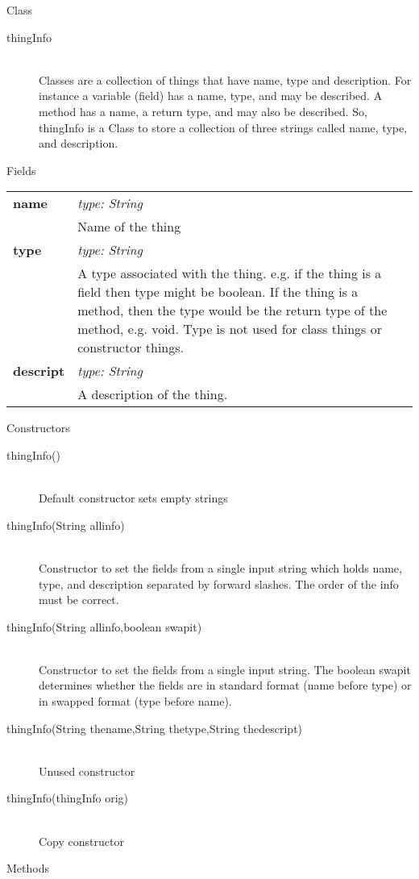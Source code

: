 \documentclass[11pt,a4paper]{article}
\newcommand \bt{\begin{longtable}{p{0.25\textwidth}p{0.74\textwidth}}}
\newcommand \et{\end{longtable}}
\newcommand{\hs}{\hspace{0.5cm}}
\newenvironment{di}
{\begin{flushright}
\begin{minipage}{0.95\textwidth}
\begin{description}
}
{\end{description}
\end{minipage}
\end{flushright}
}
\begin{document}
\noindent
\colorbox{classbg}{\parbox{1.0\textwidth}{\Large{Class}}}
\begin{di}
\item[\large{thingInfo}]\qquad\\
Classes are a collection of things that have name, type and description. For instance a variable (field) has a name, type, and may be described. A method has a name, a return type, and may also be described. So, thingInfo is a Class to store a collection of three strings called name, type, and description.
\end{di}
\colorbox{fieldbg}{\parbox{1.0\textwidth}{\Large{Fields}}}
\bt
\hs \textbf{name} & \emph{type: String}\\
& \hs Name of the thing\\
\hs \textbf{type} & \emph{type: String}\\
& \hs A type associated with the thing. e.g. if the thing is a field then type might be boolean. If the thing is a method, then the type would be the return type of the method, e.g. void. Type is not used for class things or constructor things.\\
\hs \textbf{descript} & \emph{type: String}\\
& \hs A description of the thing.\\
\et
\noindent\colorbox{conbg}{\parbox{1.0\textwidth}{\Large{Constructors}}}
\begin{di}
\item[{thingInfo()}]\qquad\\
Default constructor sets empty strings
\item[{thingInfo(String allinfo)}]\qquad\\
Constructor to set the fields from a single input string which holds name, type, and description separated by forward slashes. The order of the info must be correct.
\item[{thingInfo(String allinfo,boolean swapit)}]\qquad\\
Constructor to set the fields from a single input string. The boolean swapit determines whether the fields are in standard format (name before type) or in swapped format (type before name).
\item[{thingInfo(String thename,String thetype,String thedescript)}]\qquad\\
Unused constructor
\item[{thingInfo(thingInfo orig)}]\qquad\\
Copy constructor
\end{di}
\colorbox{descriptbg}{\parbox{1.0\textwidth}{\Large{Methods}}}
\end{document}

